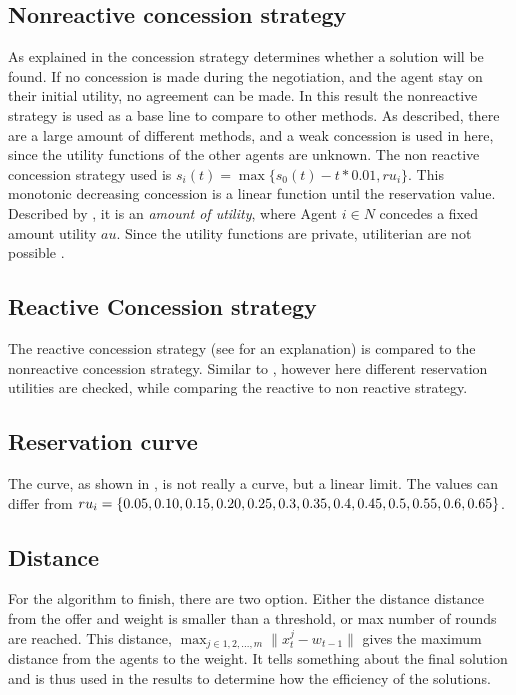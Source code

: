 \subsection{Nonreactive concession strategy}
As explained in  the concession strategy determines whether a solution will be found. If no concession is made during the negotiation, and the agent stay on their initial utility, no agreement can be made. In this result the nonreactive strategy is used as a base line to compare to other methods. As described, there are a large amount of different methods, and a weak concession is used in here, since the utility functions of the other agents are unknown. The non reactive concession strategy used is $s_i(t) = \max \{s_0(t) - t * 0.01, ru_i\}$. This monotonic decreasing concession is a linear function until the reservation value. Described by \cite{wu2009efficient}, it is an \textit{amount of utility}, where Agent $ i \in N$ concedes a fixed amount utility $au$. Since the utility functions are private, utiliterian are not possible \citep{endriss2006monotonic}.

\subsection{Reactive Concession strategy}
The reactive concession strategy (see  for an explanation) is compared to the nonreactive concession strategy. Similar to \citet{zheng2015automated}, however here different reservation utilities are checked, while comparing the reactive to non reactive strategy.

\subsection{Reservation curve}
The curve, as shown in , is not really a curve, but a linear limit. The values can differ from 	
$ru_i = \{0.05, 0.10, 0.15, 0.20, 0.25, 0.3, 0.35, 0.4, 0.45, 0.5, \\0.55, 0.6, 0.65\}$. 

\subsection{Distance}
For the algorithm  to finish, there are two option. Either the distance distance from the offer and weight is smaller than a threshold, or max number of rounds are reached. This distance, $\max_{ j \in {1,2,...,m}} \parallel x^j_t-w_{t-1} \parallel$ gives the maximum distance from the agents to the weight. It tells something about the final solution and is thus used in the results to determine how the efficiency of the solutions.

